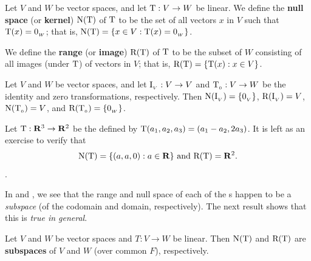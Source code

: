 \begin{definition} \label{def 2.2}
Let \(V\) and \(W\) be vector spaces, and let \(\mathrm{T} : V \to W\) be linear.
We define the \textbf{null space} (or \textbf{kernel}) \(\mathrm{N(T)}\) of \(\mathrm{T}\) to be the set of all vectors \(x\) in \(V\) such that \(\mathrm{T}(x) = 0_{_W}\);
that is, \(\mathrm{N(T)} = \{ x \in V : \mathrm{T}(x) = 0_{_W} \}\).

We define the \textbf{range} (or \textbf{image}) \(\mathrm{R(T)}\) of \(\mathrm{T}\) to be the subset of \(W\) consisting of all images (under \(\mathrm{T}\)) of vectors in \(V\);
that is, \(\mathrm{R(T)} = \{ \mathrm{T}(x) : x \in V \}\).
\end{definition}

\begin{example} \label{example 2.1.8}
Let \(V\) and \(W\) be vector spaces, and let \(\mathrm{I}_{_V} : V \to V\) and \(\mathrm{T}_{_0} : V \to W\) be the identity and zero transformations, respectively. Then \(\mathrm{N}(\mathrm{I}_{_V}) = \{ 0_{_V} \}\), \(\mathrm{R}(\mathrm{I}_{_V}) = V\), \(\mathrm{N}(\mathrm{T}_{_0}) = V\), and \(\mathrm{R}(\mathrm{T}_{_0}) = \{ 0_{_W} \}\).
\end{example}

\begin{example} \label{example 2.1.9}
Let \(\mathrm{T} : \mathbf{R}^3 \to \mathbf{R}^2\) be the \LTRAN{} defined by \(\mathrm{T}(a_1, a_2, a_3) = (a_1 - a_2, 2a_3)\).
It is left as an exercise to verify that
\[
    \mathrm{N(T)} = \{ (a, a, 0) : a \in \mathbf{R} \} \text{ and } \mathrm{R(T)} = \mathbf{R}^2.
\].
\end{example}

\begin{remark} \label{remark 2.3.4}
In  and , we see that the range and null space of each of the \LTRAN{}s happen to be a \emph{subspace} (of the codomain and domain, respectively).
The next result shows that this is \emph{true in general}.
\end{remark}

\begin{theorem} \label{thm 2.1}
Let \(V\) and \(W\) be vector spaces and \(T : V \to W\) be linear.
Then \(\mathrm{N(T)}\) and \(\mathrm{R(T)}\) are \textbf{subspaces} of \(V\) and \(W\) (over common \(F\)), respectively.
\end{theorem}

